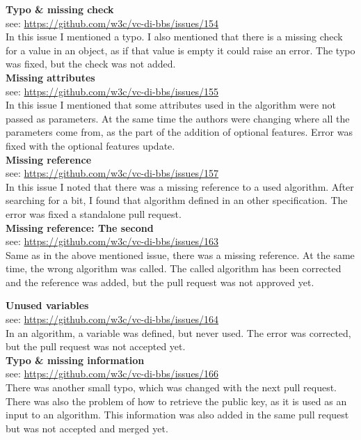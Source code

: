 \documentclass[
	a4paper               %
	,BCOR=0mm            %
	,bibliography=totoc   %
	,listof=totoc         %
	,monolingual
	,twoside=false
]{bfhthesis}              %
\begin{document}
\noindent
\textbf{Typo \& missing check}\\
see: \url{https://github.com/w3c/vc-di-bbs/issues/154}\\
In this issue I mentioned a typo. I also mentioned that there is a missing check for a value in an object, as if that value is empty it could raise an error.
The typo was fixed, but the check was not added.\\

\noindent
\textbf{Missing attributes}\\
see: \url{https://github.com/w3c/vc-di-bbs/issues/155}\\
In this issue I mentioned that some attributes used in the algorithm were not passed as parameters. At the same time the authors were changing where all the parameters come from, as the part of the addition of optional features. Error was fixed with the optional features update.\\

\noindent
\textbf{Missing reference}\\
see: \url{https://github.com/w3c/vc-di-bbs/issues/157}\\
In this issue I noted that there was a missing reference to a used algorithm. After searching for a bit, I found that algorithm defined in an other specification. The error was fixed a standalone pull request.\\

\noindent
\textbf{Missing reference: The second}\\
see: \url{https://github.com/w3c/vc-di-bbs/issues/163}\\
Same as in the above mentioned issue, there was a missing reference. At the same time, the wrong algorithm was called. The called algorithm has been corrected and the reference was added, but the pull request was not approved yet.\\
\newpage

\noindent
\textbf{Unused variables}\\
see: \url{https://github.com/w3c/vc-di-bbs/issues/164}\\
In an algorithm, a variable was defined, but never used. The error was corrected, but the pull request was not accepted yet.\\

\noindent
\textbf{Typo \& missing information}\\
see: \url{https://github.com/w3c/vc-di-bbs/issues/166}\\
There was another small typo, which was changed with the next pull request. There was also the problem of how to retrieve the public key, as it is used as an input to an algorithm. This information was also added in the same pull request but was not accepted and merged yet.\\
\end{document}
